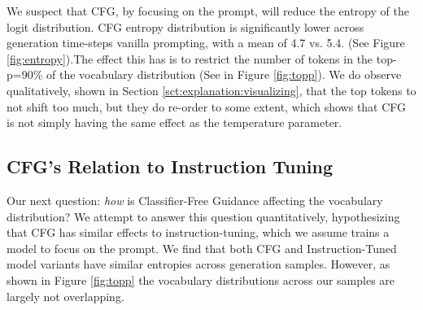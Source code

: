 \documentclass{article}
\begin{document}
We suspect that CFG, by focusing  on the prompt, will reduce the entropy of the logit distribution. CFG entropy distribution is significantly lower across generation time-steps  vanilla prompting, with a mean of 4.7 vs. 5.4. (See Figure \ref{fig:entropy}).The effect this has is to restrict the number of tokens in the top-p=90\% of the vocabulary distribution (See in Figure \ref{fig:topp}). We do observe qualitatively, shown in Section \ref{sct:explanation:visualizing}, that the top tokens to not shift too much, but they do re-order to some extent, which shows that CFG is not simply having the same effect as the temperature parameter.

\subsection{CFG's Relation to Instruction Tuning}
\label{sct:explanation:instruction}

Our next question: \textit{how} is Classifier-Free Guidance affecting the vocabulary distribution? We attempt to answer this question quantitatively, hypothesizing that CFG has similar effects to instruction-tuning, which we assume trains a model to focus on the prompt.  We find that both CFG and Instruction-Tuned model variants have similar entropies across generation samples. However, as shown in Figure \ref{fig:topp} the vocabulary distributions across our samples are largely not overlapping. 
\end{document}
